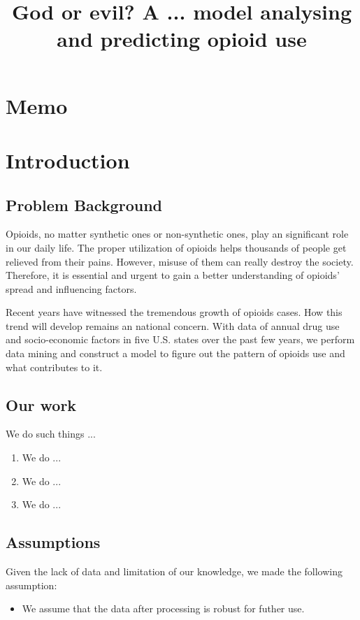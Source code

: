 \documentclass[11pt]{article}
\title{\large God or evil? A ... model analysing and predicting opioid use}  %
\newcommand{\upcite}[1]{\textsuperscript{\textsuperscript{\cite{#1}}}}
\begin{document}

\section*{Memo}
\newpage

\section{Introduction}
\subsection{Problem Background}
Opioids, no matter synthetic ones or non-synthetic ones, play an significant role in our daily life. The proper utilization of opioids helps thousands of people get relieved from their pains. However, misuse of them can really destroy the society. Therefore, it is essential and urgent to gain a better understanding of opioids' spread and influencing factors.

Recent years have witnessed the tremendous growth of opioids cases. How this trend will develop remains an national concern. With data of annual drug use and socio-economic factors in five U.S. states over the past few years, we perform data mining and construct a model to figure out the pattern of opioids use and what contributes to it.


\subsection{Our work}
We do such things ...

\begin{enumerate}[\bfseries 1.]
    \item We do ...
    \item We do ...
    \item We do ...
\end{enumerate}

\subsection{Assumptions}
Given the lack of data and limitation of our knowledge, we made the following assumption:
\begin{itemize}
    \item We assume that the data after processing is robust for futher use.
\end{itemize}
\end{document}
